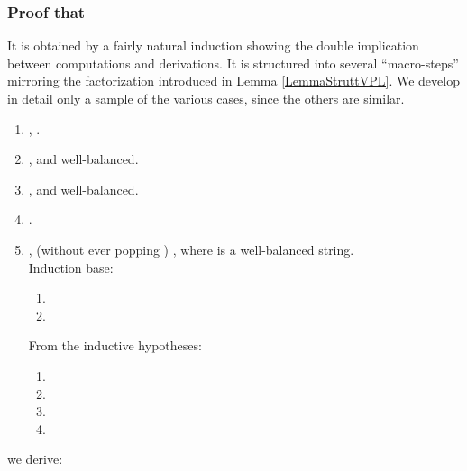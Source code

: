 \documentclass[3p,11pt]{elsarticle}
\begin{document}
\subsubsection*{Proof that }
It is obtained by a fairly natural induction showing the double implication between computations and derivations. It is structured into several ``macro-steps'' mirroring the factorization introduced in Lemma \ref{LemmaStruttVPL}. We develop in detail only a sample of the various cases, since the others are similar.
\begin{enumerate}
    \item , .
    \\

    \item ,  and well-balanced.
    \\

    \item ,  and well-balanced.
    \\

    \item .
    \\
\item ,
     (without ever popping )
    , where  is a well-balanced string.
    \\
    Induction base:
    \begin{enumerate}
        \item 


        \item 
    \end{enumerate}
     From the inductive hypotheses:
     \begin{enumerate}
        \item 

        \item  

        \item  

        \item  

    \end{enumerate}
\end{enumerate}
we derive:
\end{document}
